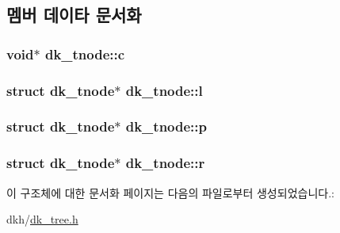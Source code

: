 \subsection{멤버 데이타 문서화}
\hypertarget{structdk__tnode_a4d8427a1419ca15308105dae0621c2bf}{
\subsubsection[{c}]{\setlength{\rightskip}{0pt plus 5cm}void$\ast$ dk\+\_\+tnode\+::c}}\label{structdk__tnode_a4d8427a1419ca15308105dae0621c2bf}
\hypertarget{structdk__tnode_acf718a20eaecd8c363ef2f70742013a5}{
\subsubsection[{l}]{\setlength{\rightskip}{0pt plus 5cm}struct {\bf dk\+\_\+tnode}$\ast$ dk\+\_\+tnode\+::l}}\label{structdk__tnode_acf718a20eaecd8c363ef2f70742013a5}
\hypertarget{structdk__tnode_a3a3fdb7d00634c393fad557eb15f0166}{
\subsubsection[{p}]{\setlength{\rightskip}{0pt plus 5cm}struct {\bf dk\+\_\+tnode}$\ast$ dk\+\_\+tnode\+::p}}\label{structdk__tnode_a3a3fdb7d00634c393fad557eb15f0166}
\hypertarget{structdk__tnode_a13392f297542ba6ec06da4e389ef3d7f}{
\subsubsection[{r}]{\setlength{\rightskip}{0pt plus 5cm}struct {\bf dk\+\_\+tnode}$\ast$ dk\+\_\+tnode\+::r}}\label{structdk__tnode_a13392f297542ba6ec06da4e389ef3d7f}


이 구조체에 대한 문서화 페이지는 다음의 파일로부터 생성되었습니다.\+:\begin{DoxyCompactItemize}
\item 
dkh/\hyperlink{dk__tree_8h}{dk\+\_\+tree.\+h}\end{DoxyCompactItemize}
